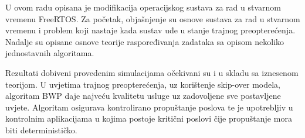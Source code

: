 \documentclass[../zavrsni.tex]{subfiles}
\begin{document}
\sloppy

\justifying

U ovom radu opisana je modifikacija operacijskog sustava za rad u stvarnom vremenu FreeRTOS. Za početak, objašnjenje su osnove sustava za 
rad u stvarnom vremenu i problem koji nastaje kada sustav uđe u stanje trajnog preopterećenja. Nadalje su opisane osnove teorije raspoređivanja 
zadataka sa opisom nekoliko jednostavnih algoritama.

Rezultati dobiveni provedenim simulacijama očekivani su i u skladu sa iznesenom teorijom. U uvjetima trajnog preopterećenja, uz korištenje skip-over modela,  
algoritam BWP daje najveću kvalitetu usluge uz zadovoljene sve postavljene uvjete. Algoritam osigurava kontrolirano propuštanje poslova te je upotrebljiv 
u kontrolnim aplikacijama u kojima postoje kritični poslovi čije propuštanje mora biti determinističko.
\end{document}
